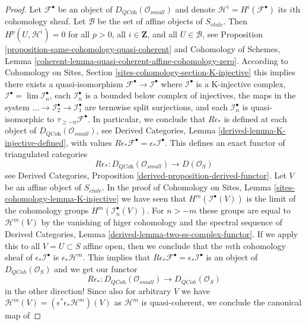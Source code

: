 \begin{proof}
\medskip\noindent
Let $\mathcal{F}^\bullet$ be an object of
$D_{\textit{QCoh}}(\mathcal{O}_{small})$
and denote $\mathcal{H}^i = H^i(\mathcal{F}^\bullet)$ its $i$th cohomology
sheaf. Let $\mathcal{B}$ be the set of affine objects of $S_{\acute{e}tale}$.
Then $H^p(U, \mathcal{H}^i) = 0$ for all $p > 0$, all $i \in \mathbf{Z}$,
and all $U \in \mathcal{B}$, see
Proposition \ref{proposition-same-cohomology-quasi-coherent}
and
Cohomology of Schemes, Lemma
\ref{coherent-lemma-quasi-coherent-affine-cohomology-zero}.
According to
Cohomology on Sites, Section \ref{sites-cohomology-section-K-injective}
this implies there exists a quasi-isomorphism
$\mathcal{F}^\bullet \to \mathcal{I}^\bullet$ where
$\mathcal{I}^\bullet$ is a K-injective complex,
$\mathcal{I}^\bullet = \lim \mathcal{I}_n^\bullet$,
each $\mathcal{I}_n^\bullet$ is a bounded below complex of injectives,
the maps in the system
$\ldots \to \mathcal{I}_2^\bullet \to \mathcal{I}_1^\bullet$
are termwise split surjections, and
each $\mathcal{I}_n^\bullet$ is quasi-isomorphic to
$\tau_{\geq -n}\mathcal{F}^\bullet$.
In particular, we conclude that $R\epsilon_*$ is defined at
each object of $D_{\textit{QCoh}}(\mathcal{O}_{small})$, see
Derived Categories, Lemma \ref{derived-lemma-K-injective-defined},
with values
$R\epsilon_*\mathcal{F}^\bullet = \epsilon_*\mathcal{I}^\bullet$.
This defines an exact functor of triangulated categories
$$
R\epsilon_* :
D_{\textit{QCoh}}(\mathcal{O}_{small})
\longrightarrow
D(\mathcal{O}_S)
$$
see
Derived Categories, Proposition \ref{derived-proposition-derived-functor}.
Let $V$ be an affine object of $S_{\acute{e}tale}$. In the proof of
Cohomology on Sites, Lemma \ref{sites-cohomology-lemma-K-injective}
we have seen that $H^m(\mathcal{I}^\bullet(V))$ is
the limit of the cohomology groups $H^m(\mathcal{I}_n^\bullet(V))$.
For $n > -m$ these groups are equal to $\mathcal{H}^m(V)$
by the vanishing of higer cohomology and the spectral sequence of
Derived Categories, Lemma \ref{derived-lemma-two-ss-complex-functor}.
If we apply this to all $V = U \subset S$ affine open, then we conclude that
the $m$th cohomology sheaf of $\epsilon_*\mathcal{I}^\bullet$ is
$\epsilon_*\mathcal{H}^m$. This implies that
$R\epsilon_*\mathcal{F}^\bullet = \epsilon_*\mathcal{I}^\bullet$
is an object of $D_{QCoh}(\mathcal{O}_S)$ and we get our functor
$$
R\epsilon_* :
D_{QCoh}(\mathcal{O}_{small})
\longrightarrow
D_{QCoh}(\mathcal{O}_S)
$$
in the other direction! Since also for arbitrary $V$ we have
$\mathcal{H}^m(V) = (\epsilon^*\epsilon_*\mathcal{H}^m)(V)$
as $\mathcal{H}^m$ is quasi-coherent, we conclude the canonical map of

\end{proof}
